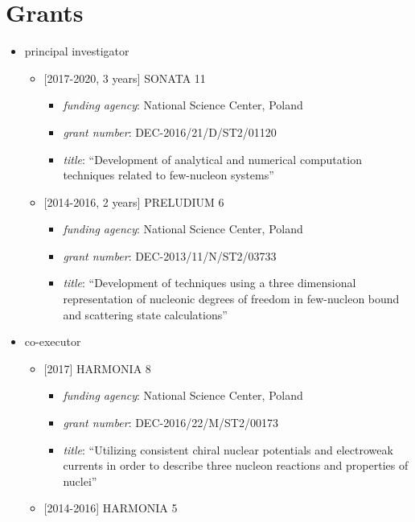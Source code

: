 \hypertarget{grants}{%
\section{Grants}\label{grants}}

\begin{itemize}
\tightlist
\item
  principal investigator

  \begin{itemize}
  \tightlist
  \item
    {[}2017-2020, 3 years{]} SONATA 11

    \begin{itemize}
    \tightlist
    \item
      \emph{funding agency}: National Science Center, Poland
    \item
      \emph{grant number}: DEC-2016/21/D/ST2/01120
    \item
      \emph{title}: ``Development of analytical and numerical
      computation techniques related to few-nucleon systems''
    \end{itemize}
  \item
    {[}2014-2016, 2 years{]} PRELUDIUM 6

    \begin{itemize}
    \tightlist
    \item
      \emph{funding agency}: National Science Center, Poland
    \item
      \emph{grant number}: DEC-2013/11/N/ST2/03733
    \item
      \emph{title}: ``Development of techniques using a three
      dimensional representation of nucleonic degrees of freedom in
      few-nucleon bound and scattering state calculations''
    \end{itemize}
  \end{itemize}
\item
  co-executor

  \begin{itemize}
  \tightlist
  \item
    {[}2017{]} HARMONIA 8

    \begin{itemize}
    \tightlist
    \item
      \emph{funding agency}: National Science Center, Poland
    \item
      \emph{grant number}: DEC-2016/22/M/ST2/00173
    \item
      \emph{title}: ``Utilizing consistent chiral nuclear potentials and
      electroweak currents in order to describe three nucleon reactions
      and properties of nuclei''
    \end{itemize}
  \item
    {[}2014-2016{]} HARMONIA 5


\end{itemize}
\end{itemize}
